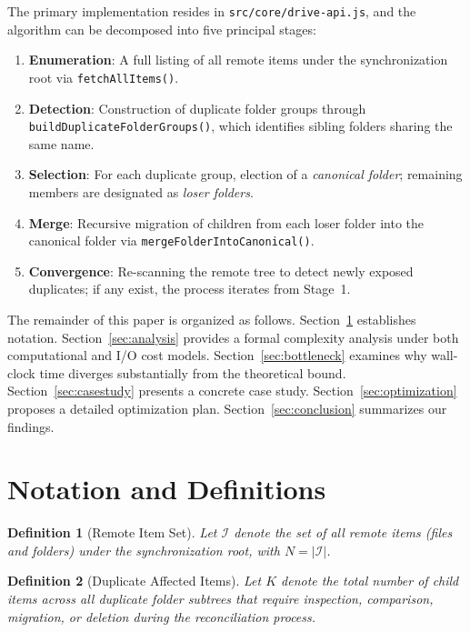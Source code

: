 \documentclass[12pt,a4paper]{article}
\newtheorem{definition}{Definition}
\begin{document}
The primary implementation resides in \texttt{src/core/drive-api.js}, and the algorithm can be decomposed into five principal stages:

\begin{enumerate}[nosep]
  \item \textbf{Enumeration}: A full listing of all remote items under the synchronization root via \texttt{fetchAllItems()}.
  \item \textbf{Detection}: Construction of duplicate folder groups through \texttt{buildDuplicateFolderGroups()}, which identifies sibling folders sharing the same name.
  \item \textbf{Selection}: For each duplicate group, election of a \emph{canonical folder}; remaining members are designated as \emph{loser folders}.
  \item \textbf{Merge}: Recursive migration of children from each loser folder into the canonical folder via \texttt{mergeFolderIntoCanonical()}.
  \item \textbf{Convergence}: Re-scanning the remote tree to detect newly exposed duplicates; if any exist, the process iterates from Stage~1.
\end{enumerate}

The remainder of this paper is organized as follows. Section~\ref{sec:notation} establishes notation. Section~\ref{sec:analysis} provides a formal complexity analysis under both computational and I/O cost models. Section~\ref{sec:bottleneck} examines why wall-clock time diverges substantially from the theoretical bound. Section~\ref{sec:casestudy} presents a concrete case study. Section~\ref{sec:optimization} proposes a detailed optimization plan. Section~\ref{sec:conclusion} summarizes our findings.


\section{Notation and Definitions}
\label{sec:notation}

\begin{definition}[Remote Item Set]
Let $\mathcal{I}$ denote the set of all remote items (files and folders) under the synchronization root, with $N = |\mathcal{I}|$.
\end{definition}

\begin{definition}[Duplicate Affected Items]
Let $K$ denote the total number of child items across all duplicate folder subtrees that require inspection, comparison, migration, or deletion during the reconciliation process.
\end{definition}
\end{document}
